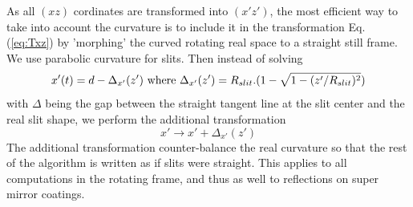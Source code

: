 As all $(xz)$ cordinates are transformed into $(x'z')$, the most efficient way to take into account the curvature is to include it in the transformation Eq. (\ref{eq:Txz}) by 'morphing' the curved rotating real space to a straight still frame. We use parabolic curvature for slits. Then instead of solving
\begin{equation}x'(t) = d - \Delta_{x'}(z') {\rm\ where\ } \Delta_{x'}(z')=R_{slit}.(1-\sqrt{1-(z'/R_{slit})^2})
\end{equation}
with $\Delta$ being the gap between the straight tangent line at the slit center and the real slit shape, we perform the additional transformation
\begin{equation}
x' \rightarrow x' + \Delta_{x'}(z')
\end{equation}
The additional transformation counter-balance the real curvature so that the rest of the algorithm is written as if slits were straight.
This applies to all computations in the rotating frame, and thus as well to reflections on super mirror coatings.
